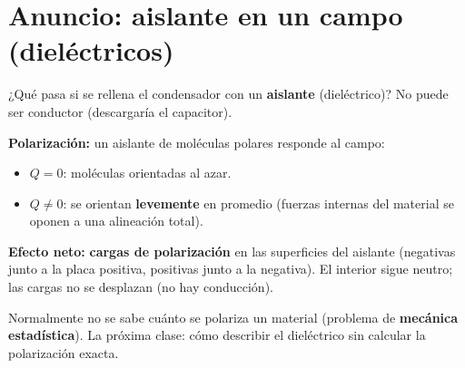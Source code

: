 \documentclass[12pt,a4paper]{article}
\begin{document}


\section{Anuncio: aislante en un campo (dieléctricos)}

¿Qué pasa si se rellena el condensador con un \textbf{aislante}
(dieléctrico)? No puede ser conductor (descargaría el capacitor).

\textbf{Polarización:} un aislante de moléculas polares responde al
campo:
\begin{itemize}[nosep]
  \item $Q=0$: moléculas orientadas al azar.
  \item $Q\neq 0$: se orientan \textbf{levemente} en promedio (fuerzas
        internas del material se oponen a una alineación total).
\end{itemize}

\textbf{Efecto neto:} \textbf{cargas de polarización} en las superficies
del aislante (negativas junto a la placa positiva, positivas junto a la
negativa). El interior sigue neutro; las cargas no se desplazan (no hay
conducción).

\begin{warnbox}[Dificultad]
  Normalmente no se sabe cuánto se polariza un material (problema de
  \textbf{mecánica estadística}). La próxima clase: cómo describir el
  dieléctrico sin calcular la polarización exacta.
\end{warnbox}


\end{document}
